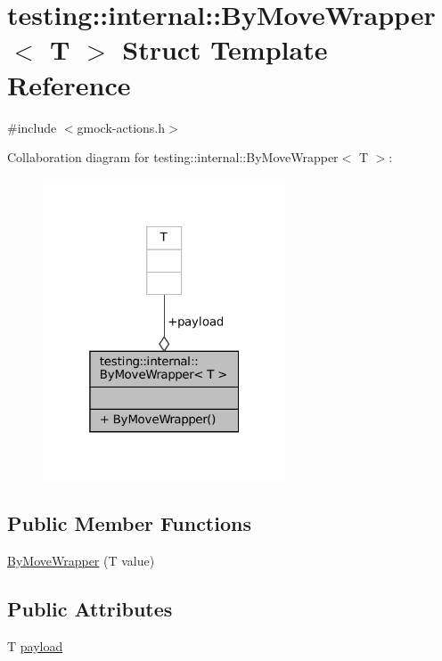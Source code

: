 \hypertarget{structtesting_1_1internal_1_1ByMoveWrapper}{}\section{testing\+:\+:internal\+:\+:By\+Move\+Wrapper$<$ T $>$ Struct Template Reference}
\label{structtesting_1_1internal_1_1ByMoveWrapper}


{\ttfamily \#include $<$gmock-\/actions.\+h$>$}



Collaboration diagram for testing\+:\+:internal\+:\+:By\+Move\+Wrapper$<$ T $>$\+:
\nopagebreak
\begin{figure}[H]
\begin{center}
\leavevmode
\includegraphics[width=205pt]{structtesting_1_1internal_1_1ByMoveWrapper__coll__graph}
\end{center}
\end{figure}
\subsection*{Public Member Functions}
\begin{DoxyCompactItemize}
\item 
\hyperlink{structtesting_1_1internal_1_1ByMoveWrapper_a60df33395785e0bfc5f72fba32376349}{By\+Move\+Wrapper} (T value)
\end{DoxyCompactItemize}
\subsection*{Public Attributes}
\begin{DoxyCompactItemize}
\item 
T \hyperlink{structtesting_1_1internal_1_1ByMoveWrapper_ae8407b1ae99db3f00797d68b9ee9e870}{payload}
\end{DoxyCompactItemize}


